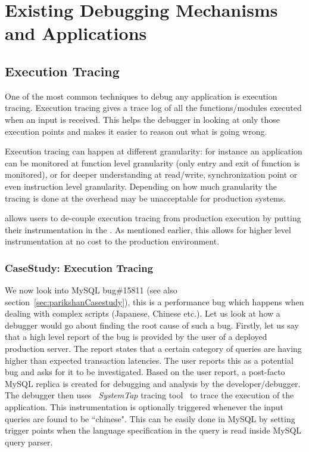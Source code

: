 \section{Existing Debugging Mechanisms and Applications}
\label{sec:activeExistingTechniques}

\subsection{Execution Tracing}
\label{sec:activeExecutionTracing}

One of the most common techniques to debug any application is execution tracing. 
Execution tracing gives a trace log of all the functions/modules executed when an input is received. 
This helps the debugger in looking at only those execution points and makes it easier to reason out what is going wrong.

Execution tracing can happen at different granularity: for instance an application can be monitored at function level granularity (only entry and exit of function is monitored), or for deeper understanding at read/write, synchronization point or even instruction level granularity.
Depending on how much granularity the tracing is done at the overhead may be unacceptable for production systems.

\parikshan allows users to de-couple execution tracing from production execution by putting their instrumentation in the \debugcontainer.
As mentioned earlier, this allows for higher level instrumentation at no cost to the production environment. 

\subsubsection{CaseStudy: Execution Tracing}

We now look into MySQL bug\#15811 (see also section~\ref{sec:parikshanCasestudy}), this is a performance bug which happens when dealing with complex scripts (Japanese, Chinese etc.). Let us look at how a debugger would go about finding the root cause of such a bug.
Firstly, let us say that a high level report of the bug is provided by the user of a deployed production server.  
The report states that a certain category of queries are having higher than expected transaction latencies.
The user reports this as a potential bug and asks for it to be investigated.
Based on the user report, a post-facto MySQL replica is created for debugging and analysis by the developer/debugger.
The debugger then uses ~\emph{SystemTap} tracing tool~\cite{systemtap} to trace the execution of the application. 
This instrumentation is optionally triggered whenever the input queries are found to be ``chinese". 
This can be easily done in MySQL by setting trigger points when the language specification in the query is read inside MySQL query parser.

